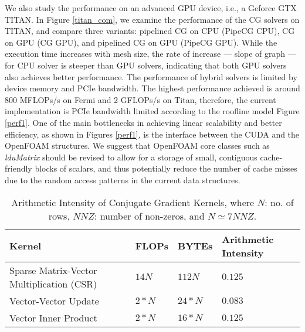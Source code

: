 \documentclass[3p,times]{elsarticle}
\begin{document}
We also study the performance on an advanced GPU device, i.e., a Geforce GTX TITAN. In Figure \ref{titan_com}, we examine the performance of the CG solvers on TITAN, and compare three variants: pipelined CG on CPU (PipeCG CPU), CG on GPU (CG GPU), and pipelined CG on GPU (PipeCG GPU). While the execution time increases with mesh size, the rate of increase --- slope of graph --- for CPU solver is steeper than GPU solvers, indicating that both GPU solvers also achieves better performance. The performance of hybrid solvers is limited by device memory and PCIe bandwidth. The highest performance achieved is around 800 MFLOPs/s on Fermi and 2 GFLOPs/s on Titan, therefore, the current implementation is PCIe bandwidth limited according to the roofline model Figure \ref{perf1}. One of the main bottlenecks in achieving linear scalability and better efficiency, as shown in Figures \ref{perf1}, is the interface between the CUDA and the OpenFOAM structures. We suggest that OpenFOAM core classes such as \emph{lduMatrix} should be revised to allow for a storage of small, contiguous cache-friendly blocks of scalars, and thus potentially reduce the number of cache misses due to the random access patterns in the current data structures. \\


 \begin{table}[h]
  \begin{center}
     \caption{Arithmetic Intensity of Conjugate Gradient Kernels, where \emph{$N$}: no. of rows, \emph{$NNZ$}: number of non-zeros, and \emph{$N \simeq 7 NNZ$}.}
    \label{ai_cg}
    \begin{tabular}{ | l | l | l |  p{4cm} |}
    \hline
    Kernel & FLOPs & BYTEs & Arithmetic Intensity  \\ \hline
    Sparse Matrix-Vector Multiplication (CSR) & \emph{$14 N$} & \emph{$112 N$} & \emph{$0.125$} \\ \hline
    Vector-Vector Update & \emph{$2*N$} & \emph{$24*N$} & \emph{$0.083$} \\ \hline
    Vector Inner Product & \emph{$2*N$} & \emph{$16*N$} & \emph{$0.125$} \\\hline
    \end{tabular}
    \end{center}
    \end{table}
\end{document}
